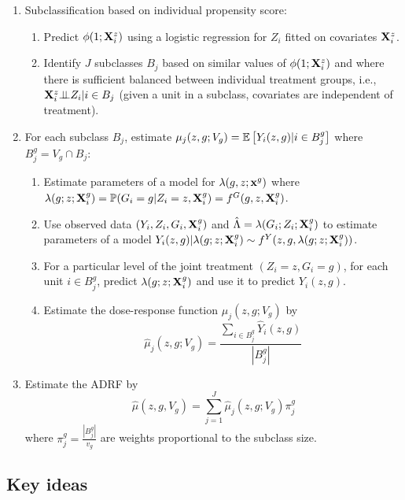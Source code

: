 \documentclass[10pt]{article}
\begin{document}
\begin{enumerate}

\item
Subclassification based on individual propensity score:
\begin{enumerate}
\item
Predict $\phi(1;\mathbf{X}_i^z)$ using a logistic regression for $Z_i$ fitted on covariates $\mathbf{X}_i^z$.
\item
Identify $J$ subclasses $B_j$ based on similar values of $\phi(1;\mathbf{X}_i^z)$ and where there is sufficient balanced between individual treatment groups, i.e., $\mathbf{X}_i^z{\perp\!\!\!\perp} Z_i|i\in B_j$ (given a unit in a subclass, covariates are independent of treatment).
\end{enumerate}

\item
For each subclass $B_j$, estimate $\mu_j(z,g;V_g) = \mathbb{E}\left[Y_i(z,g)|i\in B_j^g\right]$ where $B_j^g= V_g\cap B_j$:
\begin{enumerate}
\item
Estimate parameters of a model for $\lambda(g,z;\mathbf{x}^g)$ where $\lambda(g;z;\mathbf{X}_i^g) = \mathbb{P}(G_i=g|Z_i=z,\mathbf{X}_i^g) = f^G(g,z,\mathbf{X}_i^g)$.
\item
Use observed data $(Y_i,Z_i,G_i,\mathbf{X}_i^g)$ and $\hat{\Lambda}=\lambda(G_i;Z_i;\mathbf{X}_i^g)$ to estimate parameters of a model $Y_i(z,g)|\lambda(g;z;\mathbf{X}_i^g) \sim f^Y(z,g,\lambda(g;z;\mathbf{X}_i^g))$.
\item
For a particular level of the joint treatment $(Z_i=z,G_i=g)$, for each unit $i\in B_j^g$, predict $\lambda(g;z;\mathbf{X}_i^g)$ and use it to predict $Y_i(z,g)$.
\item
Estimate the dose-response function $\mu_j(z,g;V_g)$ by
\[
\hat{\mu}_j(z,g;V_g) = \frac{\sum_{i\in B_j^g}\hat{Y}_i(z,g)}{|B_j^g|}
\]
\end{enumerate}

\item
Estimate the ADRF by
\[
\hat{\mu}(z,g,V_g) = \sum_{j=1}^J\hat{\mu}_j(z,g;V_g)\pi_j^g
\]
where $\pi_j^g=\frac{|B_j^g|}{v_g}$ are weights proportional to the subclass size.

\end{enumerate}


\newpage


\subsection{Key ideas}
\end{document}
